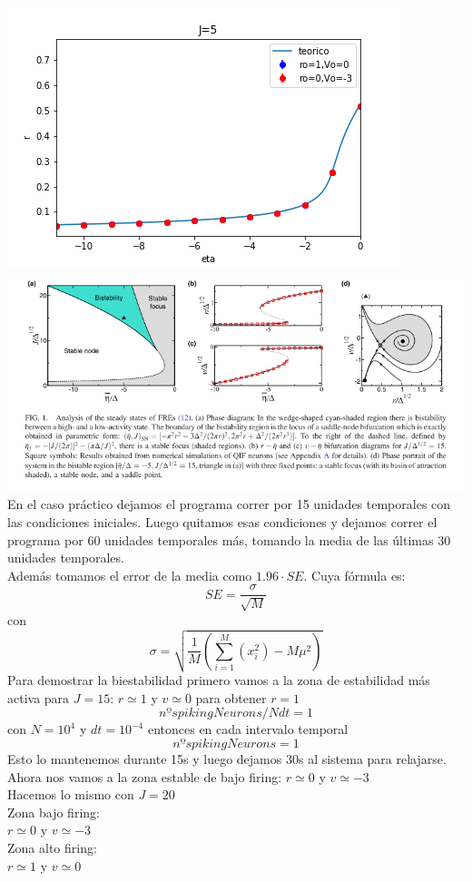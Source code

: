 \documentclass[a4paper]{article}
\begin{document}
\includegraphics[scale=0.7]{r_vs_eta_J5.png}\\
\includegraphics[scale=0.4]{diagramaspaper.png}\\

En el caso práctico dejamos el programa correr por 15 unidades temporales con las condiciones iniciales. Luego quitamos esas condiciones y dejamos correr el programa por 60 unidades temporales más, tomando la media de las últimas 30 unidades temporales.\\
Además tomamos el error de la media como $1.96\cdot SE$. Cuya fórmula es:
$$SE = \frac{\sigma}{\sqrt{M}}$$
con
$$\sigma = \sqrt{\frac{1}{M}\left(\sum^M_ {i=1} (x^2_i)-M\mu^2\right)} $$
Para demostrar la biestabilidad primero vamos a la zona de estabilidad más activa para $ J = 15$:
$r\simeq 1$ y $ v\simeq 0$
para obtener  $r = 1$
$$nºspikingNeurons/Ndt = 1$$
con $N = 10^4$ y $dt = 10^{-4}$
entonces en cada intervalo temporal
$$nºspikingNeurons = 1$$
Esto lo mantenemos durante 15s y luego dejamos 30s al sistema para relajarse.
Ahora nos vamos a la zona estable de bajo firing:
$r\simeq 0$ y $ v\simeq -3$\\

Hacemos lo mismo con $J = 20$\\
Zona bajo firing:\\
$r\simeq 0$ y $ v\simeq -3$\\
Zona alto firing:\\
$r\simeq 1$ y $ v\simeq 0$\\
\end{document}
